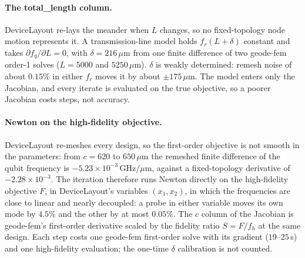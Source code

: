 \documentclass{anvil-paper}
\begin{document}
\paragraph{The total\_length column.}
DeviceLayout re-lays the meander when $L$ changes, so no fixed-topology
node motion represents it. A transmission-line model holds $f_r(L+\delta)$
constant and takes $\partial f_q/\partial L = 0$, with $\delta =
216\,\mu$m from one finite difference of two geode-fem order-1 solves
($L = 5000$ and $5250\,\mu$m). $\delta$ is weakly determined: remesh noise
of about $0.15\%$ in either $f_r$ moves it by about $\pm175\,\mu$m. The
model enters only the Jacobian, and every iterate is evaluated on the true
objective, so a poorer Jacobian costs steps, not accuracy.

\paragraph{Newton on the high-fidelity objective.}
DeviceLayout re-meshes every design, so the first-order objective is not
smooth in the parameters: from $c = 620$ to $650\,\mu$m the remeshed finite
difference of the qubit frequency is $-5.23\times10^{-3}$\,GHz/$\mu$m,
against a fixed-topology derivative of $-2.28\times10^{-3}$. The iteration
therefore runs Newton directly on the high-fidelity objective $F$, in
DeviceLayout's variables $(x_1, x_2)$, in which the frequencies are close
to linear and nearly decoupled: a probe in either variable moves its own
mode by $4.5\%$ and the other by at most $0.05\%$. The $c$ column of the
Jacobian is geode-fem's first-order derivative scaled by the fidelity
ratio $S = F/f_h$ at the same design. Each step costs one geode-fem
first-order solve with its gradient ($19$--$25$\,s) and one high-fidelity
evaluation; the one-time $\delta$ calibration is not counted.
\end{document}
